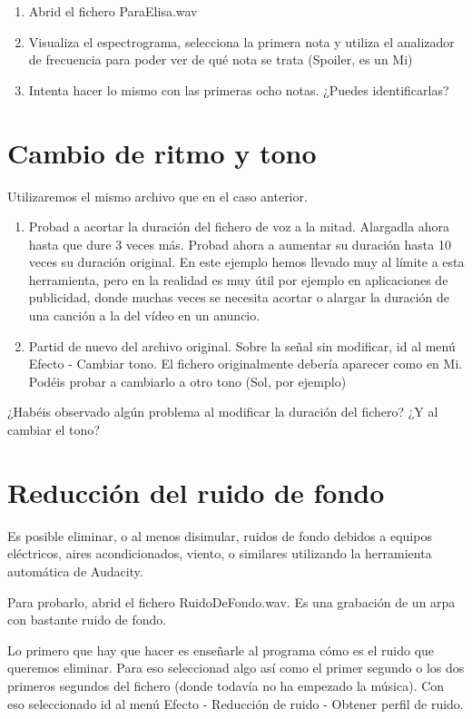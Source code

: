 \documentclass[es,practica]{uah}
\begin{document}
\begin{enumerate}
	\item Abrid el fichero ParaElisa.wav
	\item Visualiza el espectrograma, selecciona la primera nota y utiliza el analizador de frecuencia para poder ver de qué nota se trata (Spoiler, es un Mi)
	\item Intenta hacer lo mismo con las primeras ocho notas. ¿Puedes identificarlas?
\end{enumerate}


\section{Cambio de ritmo y tono}

Utilizaremos el mismo archivo que en el caso anterior. 

\begin{enumerate}
	\item Probad a acortar la duración del fichero de voz a la mitad. Alargadla ahora hasta que dure 3 veces más. Probad ahora a aumentar su duración hasta 10 veces su duración original. En este ejemplo hemos llevado muy al límite a esta herramienta, pero en la realidad es muy útil por ejemplo en aplicaciones de publicidad, donde muchas veces se necesita acortar o alargar la duración de una canción a la del vídeo en un anuncio.
	\item Partid de nuevo del archivo original. Sobre la señal sin modificar, id al menú Efecto - Cambiar tono. El fichero originalmente debería aparecer como en Mi. Podéis probar a cambiarlo a otro tono (Sol, por ejemplo)
\end{enumerate}
¿Habéis observado algún problema al modificar la duración del fichero? ¿Y al cambiar el tono?


\section{Reducción del ruido de fondo}

Es posible eliminar, o al menos disimular, ruidos de fondo debidos a equipos eléctricos, aires acondicionados, viento, o similares utilizando la herramienta automática de Audacity. 

Para probarlo, abrid el fichero RuidoDeFondo.wav. Es una grabación de un arpa con bastante ruido de fondo. 

Lo primero que hay que hacer es enseñarle al programa cómo es el ruido que queremos eliminar. Para eso seleccionad algo así como el primer segundo o los dos primeros segundos del fichero (donde todavía no ha empezado la música). Con eso seleccionado id al menú Efecto - Reducción de ruido - Obtener perfil de ruido.
\end{document}
